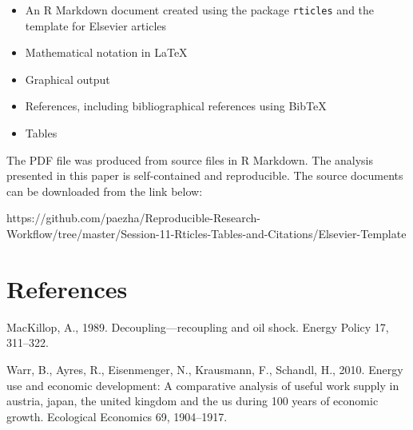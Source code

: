 \documentclass[]{elsarticle} %
\providecommand{\tightlist}{%
  \setlength{\itemsep}{0pt}\setlength{\parskip}{0pt}}
\begin{document}
\begin{itemize}
\tightlist
\item
  An R Markdown document created using the package \texttt{rticles} and
  the template for Elsevier articles
\item
  Mathematical notation in LaTeX
\item
  Graphical output
\item
  References, including bibliographical references using BibTeX
\item
  Tables
\end{itemize}

The PDF file was produced from source files in R Markdown. The analysis
presented in this paper is self-contained and reproducible. The source
documents can be downloaded from the link below:

https://github.com/paezha/Reproducible-Research-Workflow/tree/master/Session-11-Rticles-Tables-and-Citations/Elsevier-Template

\hypertarget{references}{%
\section*{References}\label{references}}

\hypertarget{refs}{}
\leavevmode\hypertarget{ref-Mackillop1989decoupling}{}%
MacKillop, A., 1989. Decoupling---recoupling and oil shock. Energy
Policy 17, 311--322.

\leavevmode\hypertarget{ref-Warr2010energy}{}%
Warr, B., Ayres, R., Eisenmenger, N., Krausmann, F., Schandl, H., 2010.
Energy use and economic development: A comparative analysis of useful
work supply in austria, japan, the united kingdom and the us during 100
years of economic growth. Ecological Economics 69, 1904--1917.
\end{document}
